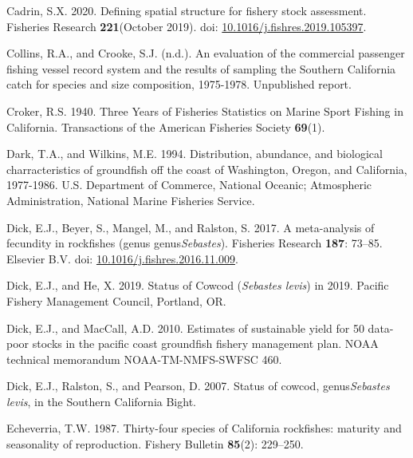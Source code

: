 \documentclass[11pt,
  english,
]{article}
\newlength{\cslhangindent}
\newenvironment{CSLReferences}[2] %
 {%
  \setlength{\parindent}{0pt}
  \ifodd #1 \everypar{\setlength{\hangindent}{\cslhangindent}}\ignorespaces\fi
  \ifnum #2 > 0
  \setlength{\parskip}{#2\baselineskip}
  \fi
 }%
 {}
\begin{document}
\begin{CSLReferences}{1}{0}
\leavevmode{}%
Cadrin, S.X. 2020. {Defining spatial structure for fishery stock assessment}. Fisheries Research \textbf{221}(October 2019). doi: \href{https://doi.org/10.1016/j.fishres.2019.105397}{10.1016/j.fishres.2019.105397}.

\leavevmode{}%
Collins, R.A., and Crooke, S.J. (n.d.). {An evaluation of the commercial passenger fishing vessel record system and the results of sampling the Southern California catch for species and size composition, 1975-1978}. Unpublished report.

\leavevmode{}%
Croker, R.S. 1940. {Three Years of Fisheries Statistics on Marine Sport Fishing in California}. Transactions of the American Fisheries Society \textbf{69}(1).

\leavevmode{}%
Dark, T.A., and Wilkins, M.E. 1994. {Distribution, abundance, and biological charracteristics of groundfish off the coast of Washington, Oregon, and California, 1977-1986}. U.S. Department of Commerce, National Oceanic; Atmospheric Administration, National Marine Fisheries Service.

\leavevmode{}%
Dick, E.J., Beyer, S., Mangel, M., and Ralston, S. 2017. {A meta-analysis of fecundity in rockfishes (genus genus\emph{Sebastes})}. Fisheries Research \textbf{187}: 73--85. Elsevier B.V. doi: \href{https://doi.org/10.1016/j.fishres.2016.11.009}{10.1016/j.fishres.2016.11.009}.

\leavevmode{}%
Dick, E.J., and He, X. 2019. {Status of Cowcod (\emph{Sebastes levis}) in 2019}. Pacific Fishery Management Council, Portland, OR.

\leavevmode{}%
Dick, E.J., and MacCall, A.D. 2010. {Estimates of sustainable yield for 50 data-poor stocks in the pacific coast groundfish fishery management plan}. NOAA technical memorandum NOAA-TM-NMFS-SWFSC 460.

\leavevmode{}%
Dick, E.J., Ralston, S., and Pearson, D. 2007. {Status of cowcod, genus\emph{Sebastes levis}, in the Southern California Bight}.

\leavevmode{}%
Echeverria, T.W. 1987. {Thirty-four species of California rockfishes: maturity and seasonality of reproduction}. Fishery Bulletin \textbf{85}(2): 229--250.


\end{CSLReferences}
\end{document}
